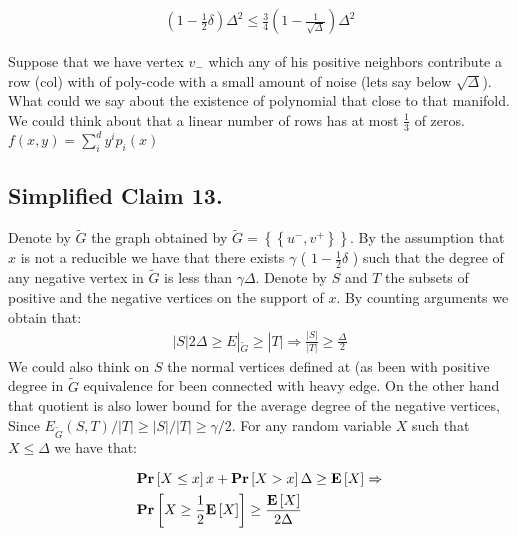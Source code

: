\begin{equation*}
  \begin{split}
    (1- \frac{1}{2}\delta)\Delta^{2} \le \frac{3}{4}\left( 1 - \frac{1}{\sqrt{\Delta}}  \right)\Delta^{2} 
  \end{split}
\end{equation*}

Suppose that we have vertex $v_{-}$ which any of his positive neighbors contribute a row (col) with of poly-code with a small amount of noise (lets say below $\sqrt{\Delta}$). What could we say about the existence of polynomial that close to that manifold. We could think about that a linear number of rows has at most $\frac{1}{3}$ of zeros.  $ f\left( x,y \right)=  \sum_{i}^{d}{y^{i}p_{i}(x)} $

\subsection{Simplified Claim 13.} 
\newcommand{\Gtt}{\tilde{G}}
Denote by $\Gtt$ the graph obtained by $\Gtt  = \left\{ \left\{ u^{-}, v^{+} \right\}  \right\} $. By the assumption that $x$ is not a reducible we have that there exists $\gamma$ ( $ 1- \frac{1}{2}\delta$  )  such that the degree of any negative vertex in $\Gtt$ is less than $\gamma\Delta$. Denote by $S$ and $T$ the subsets of positive and the negative vertices on the support of $x$. By counting arguments we obtain that: 
\begin{equation*}
  \begin{split}
    |S| 2\Delta \ge E|_{\Gtt} \ge  |T| \Rightarrow \frac{|S|}{|T|} \ge \frac{\Delta}{2}
  \end{split}
\end{equation*}
We could also think on $S$ the normal vertices defined at \cite{leverrier2022quantum} (as been with positive degree in $\Gtt$ equivalence for been connected with heavy edge. On the other hand that quotient is also lower bound for the average degree of the negative vertices, Since $E_{\Gtt}(S,T)/|T| \ge |S|/|T| \ge \gamma/2$. For any random variable $X$ such that $X \le \Delta$ we have that: 

  \begin{equation*}
    \begin{split}
      & \mathbf{Pr} \left[ {X\le x} \right]x+\mathbf{Pr} \left[ {X > x} \right]\Delta\ge \mathbf{E} \left[ {X} \right]\Rightarrow \\ 
      & \mathbf{Pr} \left[ {X \ge \frac{1}{2} \mathbf{E} \left[ {X} \right] } \right] \ge \frac{\mathbf{E} \left[ {X} \right]}{2\Delta}
    \end{split}
  \end{equation*}

